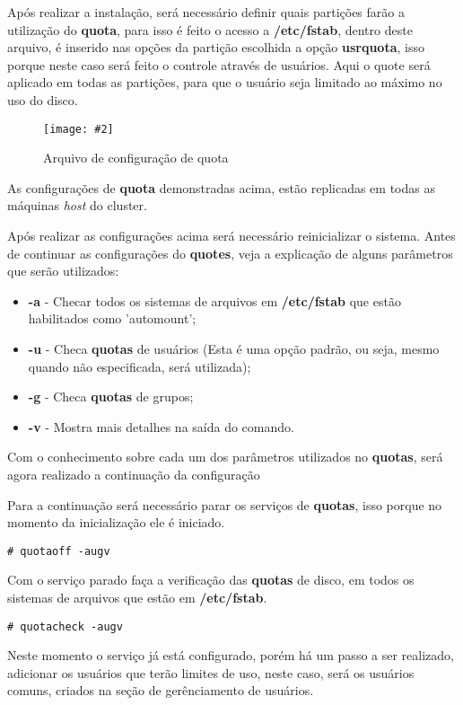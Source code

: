 \documentclass[
	12pt,				%
	openany,			%
	a4paper,			%
	chapter=TITLE,		%
	section=TITLE,		%
	english,
	brazil				%
]{abntex2}
\newcommand{\includeImage}[3] {

\begin{figure}[H]
 	 \centering
  		\texttt{[image: \#2]}
  	\caption{#3}
\end{figure}

}
\begin{document}
Após realizar a instalação, será necessário definir quais partições farão a utilização do \textbf{quota}, para isso é feito o acesso a \textbf{/etc/fstab}, dentro deste arquivo, é inserido nas opções da partição escolhida a opção \textbf{usrquota}, isso porque neste caso será feito o controle através de usuários. Aqui o quote será aplicado em todas as partições, para que o usuário seja limitado ao máximo no uso do disco.

\includeImage{0.5}{imgs/3_configuracao_quota/1.png}{Arquivo de configuração de quota}

As configurações de \textbf{quota} demonstradas acima, estão replicadas em todas as máquinas \textit{host} do cluster. 

Após realizar as configurações acima será necessário reinicializar o sistema. Antes de continuar as configurações do \textbf{quotes}, veja a explicação de alguns parâmetros que serão utilizados:
\begin{itemize}
	\item \textbf{-a} - Checar todos os sistemas de arquivos em \textbf{/etc/fstab} que estão habilitados como 'automount';
	\item \textbf{-u} - Checa \textbf{quotas} de usuários (Esta é uma opção padrão, ou seja, mesmo quando não especificada, será utilizada);
	\item \textbf{-g} - Checa \textbf{quotas} de grupos;
	\item \textbf{-v} - Mostra mais detalhes na saída do comando.
\end{itemize}

Com o conhecimento sobre cada um dos parâmetros utilizados no \textbf{quotas}, será agora realizado a continuação da configuração

Para a continuação será necessário parar os serviços de \textbf{quotas}, isso porque no momento da inicialização ele é iniciado.
\begin{lstlisting}
# quotaoff -augv 
\end{lstlisting}

Com o serviço parado faça a verificação das \textbf{quotas} de disco, em todos os sistemas de arquivos que estão em \textbf{/etc/fstab}.
\begin{lstlisting}
# quotacheck -augv
\end{lstlisting}

Neste momento o serviço já está configurado, porém há um passo a ser realizado, adicionar os usuários que terão limites de uso, neste caso, será os usuários comuns, criados na seção de gerênciamento de usuários.
\end{document}
